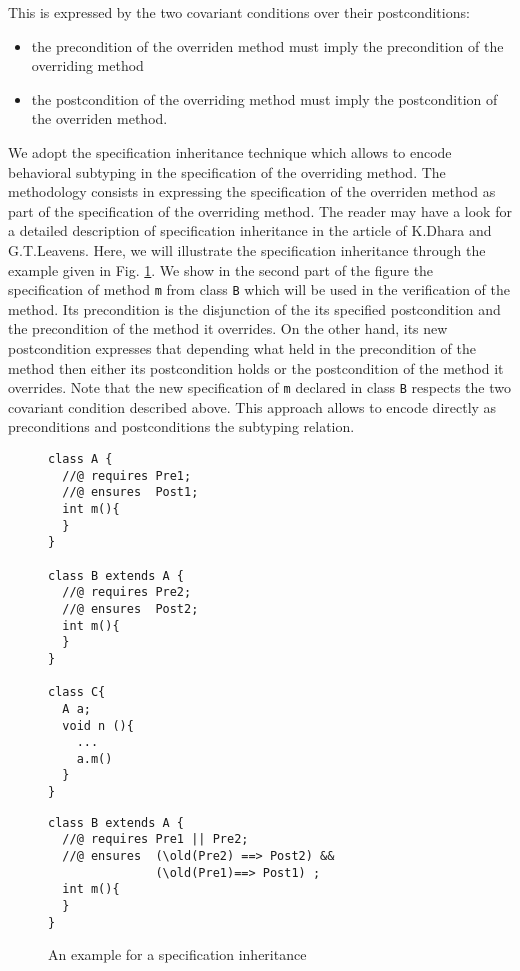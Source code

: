 \begin{description}
        This is expressed by the two covariant conditions over their postconditions:
	\begin{itemize}
	   \item the precondition of the  overriden method must  imply
	         the precondition of the overriding method 
	   \item the postcondition of the overriding method must imply 
	         the postcondition of the overriden method.
	\end{itemize}
	We adopt the specification inheritance technique which allows to encode behavioral subtyping in the specification of the 
	overriding method. The methodology consists in expressing the specification of the overriden method 
	as part of the specification of the overriding method. The reader may have a look for a detailed description of
	specification inheritance  in  the article \cite{Dhara-Leavens95} of K.Dhara and G.T.Leavens. Here, we will 
	illustrate the specification inheritance through the example given in Fig. \ref{assertLang:lang:inherit}. We show in the second part of 
	the figure the specification of method  \lstinline!m!  from class \lstinline!B! which will be used in the verification of the method.
	Its precondition is the disjunction of the its specified postcondition and the precondition of the method it overrides. On the other hand, its new postcondition expresses
	that depending what held in the precondition of the  method then either its postcondition holds or the postcondition of the method it
	overrides. Note that the new specification of \lstinline!m!  declared in class \lstinline!B!  respects the two covariant condition described above.
	This approach allows to encode directly as preconditions and postconditions the subtyping relation. 
	

\begin{figure}[ht!]
\begin{lstlisting}[frame=trbl]
class A {
  //@ requires Pre1;
  //@ ensures  Post1;
  int m(){
  }
}

class B extends A {
  //@ requires Pre2;
  //@ ensures  Post2;
  int m(){
  }
}

class C{
  A a;
  void n (){
    ...
    a.m()
  }
} 
\end{lstlisting}

\begin{lstlisting}[frame=trbl]
class B extends A {
  //@ requires Pre1 || Pre2;
  //@ ensures  (\old(Pre2) ==> Post2) && 
               (\old(Pre1)==> Post1) ;
  int m(){
  }
}

\end{lstlisting}
 
 \caption{\sc An example for a specification inheritance} \label{assertLang:lang:inherit}
\end{figure}

\end{description}



